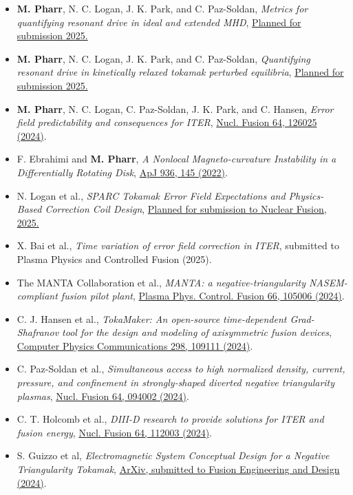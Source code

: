 \documentclass{rpires}
\begin{document}
\begin{resume}
\begin{itemize}  \itemsep -2pt %
    \item {{\bf M. Pharr}, N. C. Logan, J. K. Park, and C. Paz-Soldan, \textit{Metrics for quantifying resonant drive in ideal and extended MHD}, \href{}{Planned for submission 2025.}}
    \item {{\bf M. Pharr}, N. C. Logan, J. K. Park, and C. Paz-Soldan, \textit{Quantifying resonant drive in kinetically relaxed tokamak perturbed equilibria}, \href{}{Planned for submission 2025.}}
    \item {{\bf M. Pharr}, N. C. Logan, C. Paz-Soldan, J. K. Park, and C. Hansen, \textit{Error field predictability and consequences for ITER}, \href{https://dx.doi.org/10.1088/1741-4326/ad7ed6}{Nucl. Fusion 64, 126025 (2024)}.}
    \item {F. Ebrahimi and {\bf M. Pharr}, \textit{A Nonlocal Magneto-curvature Instability in a Differentially Rotating Disk}, \href{https://dx.doi.org/10.3847/1538-4357/ac892d}{ApJ 936, 145 (2022)}.}\vspace{0.5cm}
    \item {N. Logan et al., \textit{SPARC Tokamak Error Field Expectations and Physics-Based Correction Coil Design}, \href{}{Planned for submission to Nuclear Fusion, 2025.}}
    \item {X. Bai et al., \textit{Time variation of error field correction in ITER}, submitted to Plasma Physics and Controlled Fusion (2025).}
    \item {The MANTA Collaboration et al., \textit{MANTA: a negative-triangularity NASEM-compliant fusion pilot plant}, \href{https://iopscience.iop.org/article/10.1088/1361-6587/ad6708}{Plasma Phys. Control. Fusion 66, 105006 (2024)}.}
    \item {C. J. Hansen et al., \textit{TokaMaker: An open-source time-dependent Grad-Shafranov tool for the design and modeling of axisymmetric fusion devices}, \href{https://www.sciencedirect.com/science/article/pii/S0010465524000341}{Computer Physics Communications 298, 109111 (2024)}.}
    \item {C. Paz-Soldan et al., \textit{Simultaneous access to high normalized density, current, pressure, and confinement in strongly-shaped diverted negative triangularity plasmas}, \href{https://new.iopscience.iop.org/article/10.1088/1741-4326/ad69a4/meta}{Nucl. Fusion 64, 094002 (2024)}.}
    \item {C. T. Holcomb et al., \textit{DIII-D research to provide solutions for ITER and fusion energy}, \href{https://dx.doi.org/10.1088/1741-4326/ad2fe9}{Nucl. Fusion 64, 112003 (2024)}.}
    \item {S. Guizzo et al, \textit{Electromagnetic System Conceptual Design for a Negative Triangularity Tokamak}, \href{ https://doi.org/10.48550/arXiv.2501.14682}{ArXiv, submitted to Fusion Engineering and Design (2024)}.}
\end{itemize}


\end{resume}
\end{document}
